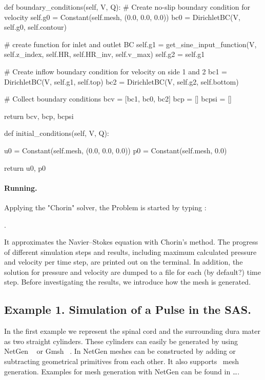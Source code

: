 \begin{code}
def boundary_conditions(self, V, Q):
	# Create no-slip boundary condition for velocity
	self.g0 = Constant(self.mesh, (0.0, 0.0, 0.0))
	bc0 = DirichletBC(V, self.g0, self.contour)

	# create function for inlet and outlet BC
	self.g1 = get_sine_input_function(V, self.z_index, self.HR, self.HR_inv, self.v_max)
	self.g2 = self.g1 

	# Create inflow boundary condition for velocity on side 1 and 2
	bc1 = DirichletBC(V, self.g1, self.top)
	bc2 = DirichletBC(V, self.g2, self.bottom)	

	# Collect boundary conditions
	bcv = [bc1, bc0, bc2]
	bcp = []
	bcpsi = []

	return bcv, bcp, bcpsi

def initial_conditions(self, V, Q):

	u0 = Constant(self.mesh, (0.0, 0.0, 0.0))
	p0 = Constant(self.mesh, 0.0)

	return u0, p0
\end{code}


\paragraph{Running.}
Applying the "Chorin" solver, the Problem is started by typing :

. 

It approximates the Navier--Stokes equation with Chorin's method. The progress of different simulation steps and results, including maximum calculated pressure and velocity per time step, are printed out on the terminal. In addition, the solution for pressure and velocity are dumped to a file for each (by default?) time step. Before investigating the results, we introduce how the mesh is generated. 


\subsection{Example 1. Simulation of a Pulse in the SAS.} 
In the first example we represent the spinal cord and the surrounding dura mater as two straight cylinders.  These cylinders can easily be generated by using NetGen ~\cite{netgen} or Gmsh ~\cite{gmsh}.  In NetGen meshes can be constructed by adding or subtracting geometrical primitives from each other. It also supports \dolfin\ mesh generation. Examples for mesh generation with NetGen can be found in \ldots. 

